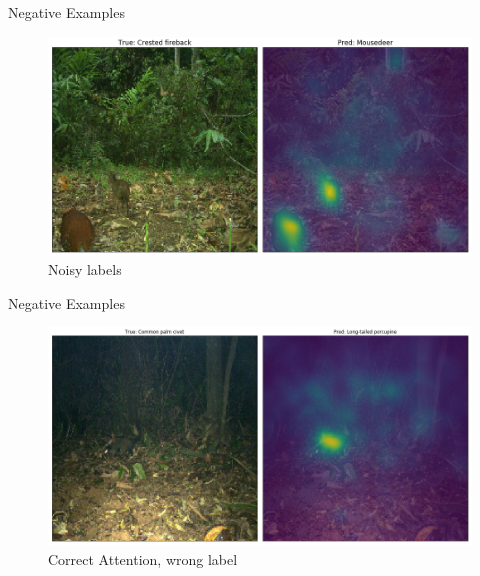 \documentclass[10pt]{beamer}
\begin{document}

\begin{frame}{Negative Examples}
	\centering
	\begin{figure}
		\includegraphics[width=\columnwidth]{images/Attention_wrong_right.png}
		\caption{Noisy labels}
	\end{figure}
\end{frame}


\begin{frame}{Negative Examples}
	\centering
	\begin{figure}
		\includegraphics[width=\columnwidth]{images/Attention_wrong.png}
		\caption{Correct Attention, wrong label}
	\end{figure}
\end{frame}

\end{document}
